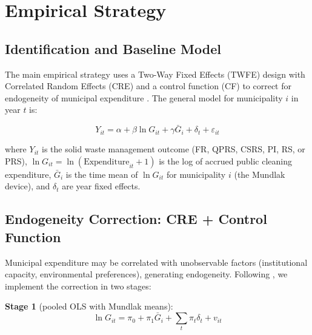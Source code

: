 
\section{Empirical Strategy}
\label{sec:estrategia}

\subsection{Identification and Baseline Model}
\label{sec:identificacion}

The main empirical strategy uses a Two-Way Fixed Effects (TWFE) design with Correlated Random Effects (CRE) and a control function (CF) to correct for endogeneity of municipal expenditure \citep{Wooldridge2015}.
The general model for municipality $i$ in year $t$ is:

\begin{equation}
  Y_{it} = \alpha + \beta \ln G_{it} + \gamma \bar{G}_{i} + \delta_{t} + \varepsilon_{it}
  \label{eq:modelo_base}
\end{equation}

\noindent where $Y_{it}$ is the solid waste management outcome (FR, QPRS, CSRS, PI, RS, or PRS),
$\ln G_{it} = \ln(\text{Expenditure}_{it} + 1)$ is the log of accrued public cleaning expenditure,
$\bar{G}_{i}$ is the time mean of $\ln G_{it}$ for municipality $i$ (the Mundlak device),
and $\delta_{t}$ are year fixed effects.

\subsection{Endogeneity Correction: CRE + Control Function}
\label{sec:cre_cf}

Municipal expenditure may be correlated with unobservable factors (institutional capacity, environmental preferences), generating endogeneity.
Following \citet{Wooldridge2015}, we implement the correction in two stages:

\textbf{Stage 1} (pooled OLS with Mundlak means):
\begin{equation}
  \ln G_{it} = \pi_0 + \pi_1 \bar{G}_{i} + \sum_t \pi_t \delta_t + v_{it}
  \label{eq:stage1}
\end{equation}

